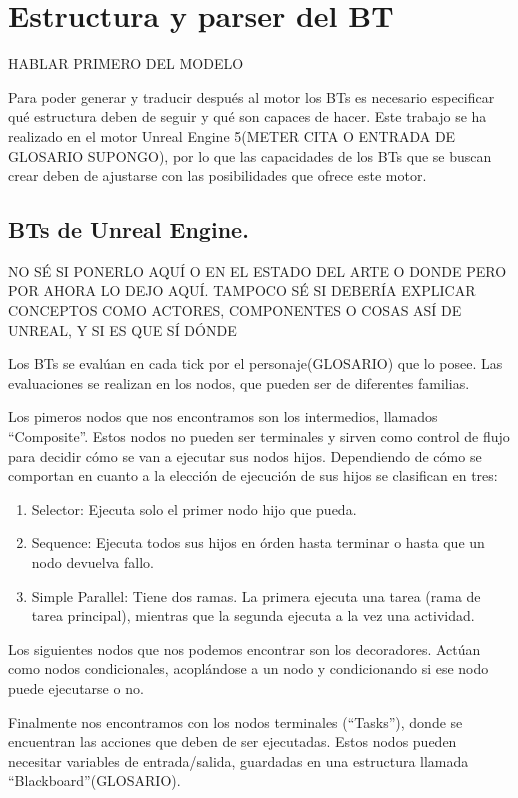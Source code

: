 \section{Estructura y parser del \gls{BT}}
\label{sec:traduccionBT}

HABLAR PRIMERO DEL MODELO

Para poder generar y traducir después al \gls{motor} los \glspl{BT} es necesario especificar qué estructura deben de seguir y qué son capaces de hacer.
Este trabajo se ha realizado en el motor Unreal Engine 5(METER CITA O ENTRADA DE GLOSARIO SUPONGO), por lo que las capacidades de los \glspl{BT} que se buscan crear deben de ajustarse con las posibilidades que ofrece este \gls{motor}.

\subsection{\glspl{BT} de Unreal Engine.}
\label{sec:UEBT}
NO SÉ SI PONERLO AQUÍ O EN EL ESTADO DEL ARTE O DONDE PERO POR AHORA LO DEJO AQUÍ.
TAMPOCO SÉ SI DEBERÍA EXPLICAR CONCEPTOS COMO ACTORES, COMPONENTES O COSAS ASÍ DE UNREAL, Y SI ES QUE SÍ DÓNDE

Los \glspl{BT} se evalúan en cada tick por el personaje(GLOSARIO) que lo posee.
Las evaluaciones se realizan en los nodos, que pueden ser de diferentes familias.

Los pimeros nodos que nos encontramos son los intermedios, llamados ``Composite''.
Estos nodos no pueden ser terminales y sirven como control de flujo para decidir cómo se van a ejecutar sus nodos hijos.
Dependiendo de cómo se comportan en cuanto a la elección de ejecución de sus hijos se clasifican en tres:
\begin{enumerate}
	\renewcommand{\theenumi}{\alph{enumi}}
	\item Selector: Ejecuta solo el primer nodo hijo que pueda.
	\item Sequence: Ejecuta todos sus hijos en órden hasta terminar o hasta que un nodo devuelva fallo.
	\item Simple Parallel: Tiene dos ramas. La primera ejecuta una tarea (rama de tarea principal), mientras que la segunda ejecuta a la vez una actividad. 
\end{enumerate}

Los siguientes nodos que nos podemos encontrar son los decoradores.
Actúan como nodos condicionales, acoplándose a un nodo y condicionando si ese nodo puede ejecutarse o no.

Finalmente nos encontramos con los nodos terminales (``Tasks''), donde se encuentran las acciones que deben de ser ejecutadas.
Estos nodos pueden necesitar variables de entrada/salida, guardadas en una estructura llamada ``Blackboard''(GLOSARIO).

